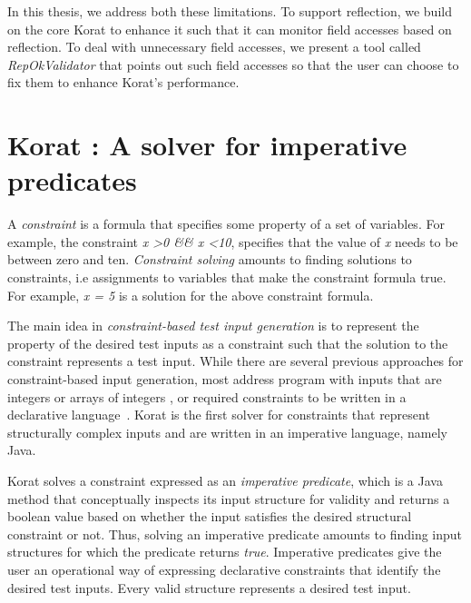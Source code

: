 \para
In this thesis, we address both these limitations.  To support reflection, we build on the core Korat to enhance it such that it can monitor field accesses based on reflection.  To deal with unnecessary field accesses, we present a tool called \emph{RepOkValidator} that points out such field accesses so that the user can choose to fix them to enhance Korat’s performance.

\section{Korat : A solver for imperative predicates}
\label{sec:korat-solver-for-predicates}
A \emph{constraint} is a formula that specifies some property of a set
of variables. For example, the constraint \emph{x \textgreater 0 \&\&
  x \textless 10}, specifies that the value of \emph{x} needs to be
between zero and ten. \emph{Constraint solving} amounts to finding
solutions to constraints, i.e assignments to variables that make the
constraint formula true. For example, \emph{x = 5} is a solution for
the above constraint formula.

\para
The main idea in \emph{constraint-based test input generation} is to
represent the property of the desired test inputs as a constraint such
that the solution to the constraint represents a test input. While
there are several previous approaches for constraint-based input
generation, most address program with inputs that are integers or
arrays of integers
\cite{demilli1991constraint,huang1975approach,king1976symbolic,korel1996automated},
or required constraints to be written in a declarative
language~\cite{marinov2001testera}. Korat \cite{boyapati2002korat} is the first
solver for constraints that represent structurally complex inputs and
are written in an imperative language, namely Java.

\para Korat solves a constraint expressed as an \emph{imperative
  predicate}, which is a Java method that conceptually inspects its
input structure for validity and returns a boolean value based on
whether the input satisfies the desired structural constraint or not.
Thus, solving an imperative predicate amounts to finding input
structures for which the predicate returns \emph{true}.  Imperative
predicates give the user an operational way of expressing declarative
constraints that identify the desired test inputs.  Every valid
structure represents a desired test input.

